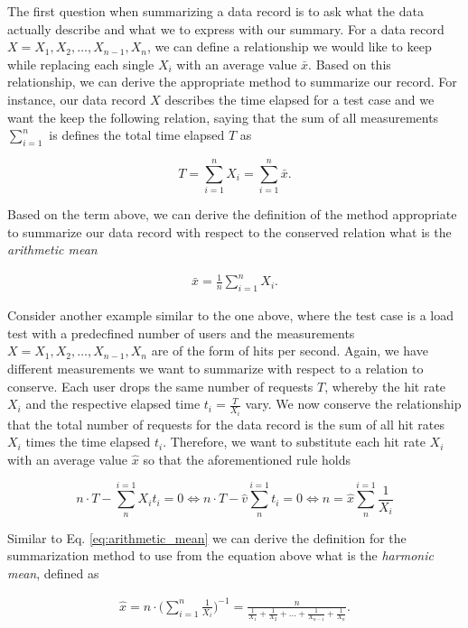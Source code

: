 The first question when summarizing a data
record is to ask what the data actually describe and what we to express with our
summary. For a data record $X = X_1, X_2, \ldots, X_{n-1}, X_n$, we can define a
relationship we would like to keep while replacing each single $X_i$ with an
average value $\bar{x}$. Based on this relationship, we can derive the
appropriate method to summarize our record. For instance, our data record $X$
describes the time elapsed for a test case and we want the keep the following
relation, saying that the sum of all measurements $\sum_{i = 1}^{n}$ is defines
the total time elapsed $T$ as

$$
T = \sum_{i = 1}^{n} X_i = \sum_{i = 1}^{n} \bar{x}.
$$

Based on the term above, we can derive the definition of the method
appropriate to summarize our data record with respect to the conserved relation
what is the \emph{arithmetic mean}

\begin{equation} \label{eq:arithmetic_mean}
\begin{split}
\bar{x} = \frac{1}{n} \sum_{i = 1}^{n} X_i.
\end{split}
\end{equation}

Consider another example similar to the one above, where the test
case is a load test with a predecfined number of users and the measurements $X = X_1, X_2,
\ldots, X_{n-1}, X_n$ are
of the form of hits per second. Again, we have different measurements we want to
summarize with respect to a relation to conserve. Each user drops the same
number of requests $T$, whereby the hit rate $X_i$ and the respective elapsed
time $t_i = \frac{T}{X_i }$ vary. We now conserve the relationship that the
total number of requests for the data record is the sum of all hit rates $X_i$
times the time elapsed $t_i$. Therefore, we want to substitute each hit rate
$X_i$ with an average value $\hat{x}$ so that the aforementioned rule holds

$$
n\cdot T - \sum_{n}^{i=1} X_it_i = 0 \Leftrightarrow n\cdot T - \hat{v}
\sum_{n}^{i=1} t_i = 0 \Leftrightarrow n = \hat{x} \sum_{n}^{i=1} \frac{1}{X_i}
$$

Similar to Eq. \ref{eq:arithmetic_mean} we can derive the definition for the summarization
method to use from the equation above what is the \emph{harmonic mean}, defined as

\begin{equation} \label{eq:harmonic_mean}
\begin{split}
\hat{x} = n \cdot \bigg(\sum_{i=1}^{n} \frac{1}{X_i}\bigg)^{-1} =
\frac{n}{\frac{1}{X_1} + \frac{1}{X_2} + \ldots +
\frac{1}{X_{n-1}} + \frac{1}{X_n}}.
\end{split}
\end{equation}

